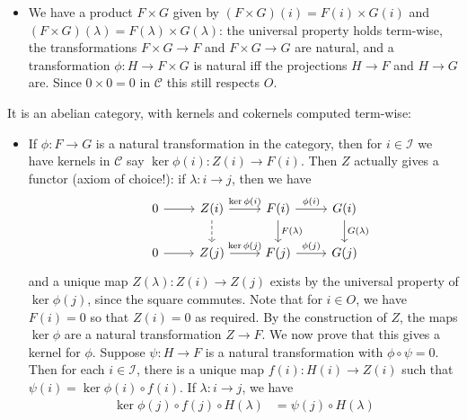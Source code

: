 \documentclass{report}
\newcommand{\I}{\mathscr{I}}
\newcommand{\scrC}{\mathscr{C}}
\begin{document}
\begin{enumerate}[label=\textbf{2.3.\Alph*.}]
\begin{itemize}
		      \item We have a product $F\times G$ given by
		            $(F\times G)(i)=F(i)\times G(i)$ and
		            $(F\times G)(\lambda)=F(\lambda)\times G(\lambda)$: the
		            universal property holds term-wise, the transformations $F\times
			            G\to F$ and $F\times G\to G$ are natural, and a transformation
		            $\phi:H\to F\times G$ is natural iff the projections $H\to F$
		            and $H\to G$ are. Since $0\times0=0$ in $\scrC$ this still
		            respects $O$.
	      \end{itemize}
	      It is an abelian category, with kernels and cokernels computed
	      term-wise:
	      \begin{itemize}
		      \item If $\phi:F\to G$ is a natural transformation in the category,
		            then for $i\in\I$ we have kernels in $\scrC$ say
		            $\ker\phi(i):Z(i)\to F(i)$. Then $Z$ actually gives a functor
		            (axiom of choice!): if $\lambda:i\to j$, then we have
		            \begin{equation*}
			            \begin{tikzcd}
				            &0 \arrow{r}
				            &Z(i) \arrow{r}{\ker\phi(i)} \arrow[dashed]{d}
				            &F(i) \arrow{r}{\phi(i)} \arrow{d}{F(\lambda)}
				            &G(i) \arrow{d}{G(\lambda)} \\
				            &0 \arrow{r}
				            &Z(j) \arrow{r}{\ker\phi(j)}
				            &F(j) \arrow{r}{\phi(j)}
				            &G(j)
			            \end{tikzcd}
		            \end{equation*}
		            and a unique map $Z(\lambda):Z(i)\to Z(j)$ exists by the
		            universal property of $\ker\phi(j)$, since the square
		            commutes. Note that for $i\in O$, we have $F(i)=0$ so that
		            $Z(i)=0$ as required. By the construction of $Z$, the maps
		            $\ker\phi$ are a natural transformation $Z\to F$. We now
		            prove that this gives a kernel for $\phi$. Suppose
		            $\psi:H\to F$ is a natural transformation with
		            $\phi\circ\psi=0$. Then for each $i\in\I$, there is a unique
		            map $f(i):H(i)\to Z(i)$ such that
		            $\psi(i)=\ker\phi(i)\circ f(i)$. If $\lambda:i\to j$, we
		            have
		            \begin{align*}
			            \ker\phi(j)\circ f(j)\circ H(\lambda)
			             & = \psi(j)\circ H(\lambda)                \\

\end{align*}
\end{itemize}
\end{enumerate}
\end{document}

